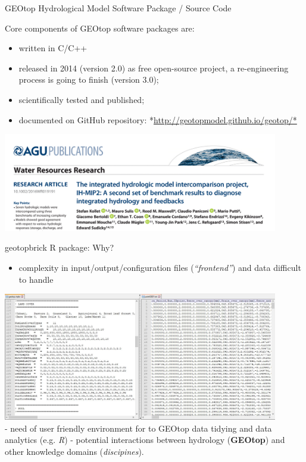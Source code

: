 \documentclass[ignorenonframetext,]{beamer}
\providecommand{\tightlist}{%
  \setlength{\itemsep}{0pt}\setlength{\parskip}{0pt}}
\begin{document}
\begin{frame}{GEOtop Hydrological Model Software Package / Source Code}

Core components of GEOtop software packages are:

\begin{itemize}
\tightlist
\item
  written in C/C++
\item
  released in 2014 (version 2.0) as free open-source project, a
  re-engineering process is going to finish (version 3.0);
\item
  scientifically tested and published;
\item
  documented on GitHub repository:
  *\url{http://geotopmodel.github.io/geotop/*}
\end{itemize}

\includegraphics[width=0.90000\textwidth]{resources/images/geotop_paper_2017.png}\\

\end{frame}

\begin{frame}{geotopbrick R package: Why?}

\begin{itemize}
\tightlist
\item
  complexity in input/output/configuration files (\emph{``frontend''})
  and data difficult to handle
\end{itemize}

\includegraphics[width=0.90000\textwidth]{resources/images/Capture_IO_GEOtopJPG.JPG}\\
- need of user friendly environment for to GEOtop data tidying and data
analytics (e.g. \emph{R}) - potential interactions between hydrology
(\textbf{GEOtop}) and other knowledge domains (\emph{discipines}).

\end{frame}
\end{document}
